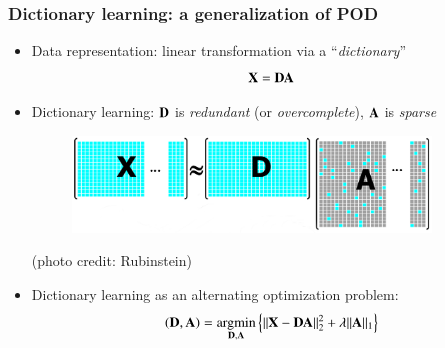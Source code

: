 \documentclass{beamer}
\let\olditem\item
\renewcommand{\item}{\setlength{\itemsep}{\fill}\olditem}
\begin{document}
\begin{frame}
	\frametitle{Dictionary learning: a generalization of POD} 
	\begin{itemize}
		\item Data representation: linear transformation via a ``\emph{dictionary}''
		\begin{equation*}
			\mathbf{X}  = \mathbf{D} \mathbf{A}
		\end{equation*}

		\item Dictionary learning: $ \mathbf{D} $ is \emph{redundant} (or \emph{overcomplete}), $ \mathbf{A} $ is \emph{sparse}
		\begin{figure}
		\centering
		\vspace*{-0.0cm}
		\includegraphics[width=0.9\textwidth]{./figures/DL/dict_rep.png}
		\vspace*{-0.5cm}	
		\end{figure}
		{\hfill \tiny (photo credit: Rubinstein)}
				
		\item Dictionary learning as an alternating optimization problem:
		\begin{equation*}
			\left(\mathbf{D}, \mathbf{A}\right)  = \operatorname*{\arg\!\min}_{\mathbf{D},\mathbf{A}} \left\lbrace \Vert \mathbf{X}-\mathbf{D} \mathbf{A}\Vert^2_2 + \lambda \Vert \mathbf{A} \Vert_1 \right\rbrace
		\end{equation*}
	\end{itemize}
\end{frame}
\end{document}
